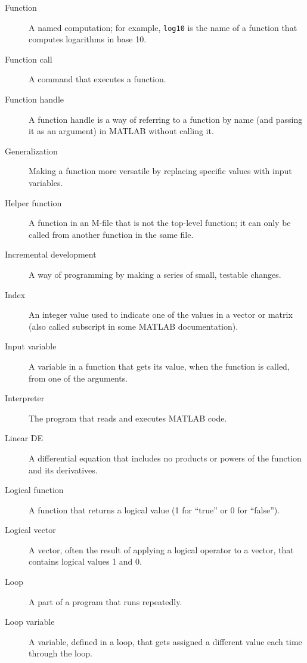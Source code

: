 \begin{description}
\item[Function] A named computation; for example, \lstinline{log10} is the
name of a function that computes logarithms in base 10.

\item[Function call] A command that executes a function.

\item[Function handle] A function handle is a way of
referring to a function by name (and passing it as an argument)
in MATLAB without calling it.

\item[Generalization] Making a function more versatile by replacing
specific values with input variables.

\item[Helper function] A function in an M-file that is not
the top-level function; it can only be called from another function
in the same file.

\item[Incremental development] A way of programming by making a series
of small, testable changes.

\item[Index] An integer value used to indicate one of the values
in a vector or matrix (also called subscript in some MATLAB documentation).

\item[Input variable] A variable in a function that gets its value,
when the function is called, from one of the arguments.

\item[Interpreter] The program that reads and executes MATLAB code.

\item[Linear DE] A differential equation that includes no products or powers of the
function and its derivatives.

\item[Logical function] A function that returns a logical value
(1 for ``true'' or 0 for ``false'').

\item[Logical vector] A vector, often the result of applying a logical operator to a vector, that contains logical values 1 and 0.

\item[Loop] A part of a program that runs repeatedly.

\item[Loop variable] A variable, defined in a loop,
that gets assigned a different value each time through the loop.


\end{description}
